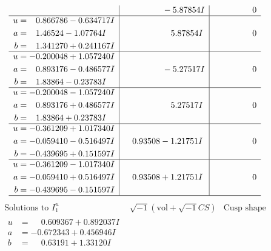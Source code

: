 \documentclass[1p]{elsarticle_modified}
\theoremstyle{definition}
\newcommand{\I}{\sqrt{-1}}
\begin{document}
$$\begin{array}{c|c|c}
 & \phantom{-0.000000 } -5.87854 I & \phantom{-0.000000 } 0 \\ \hline\begin{aligned}
u &= \phantom{-}0.866786 - 0.634717 I \\
a &= \phantom{-}1.46524 - 1.07764 I \\
b &= \phantom{-}1.341270 + 0.241167 I\end{aligned}
 & \phantom{-0.000000 -}5.87854 I & \phantom{-0.000000 } 0 \\ \hline\begin{aligned}
u &= -0.200048 + 1.057240 I \\
a &= \phantom{-}0.893176 - 0.486577 I \\
b &= \phantom{-}1.83864 - 0.23783 I\end{aligned}
 & \phantom{-0.000000 } -5.27517 I & \phantom{-0.000000 } 0 \\ \hline\begin{aligned}
u &= -0.200048 - 1.057240 I \\
a &= \phantom{-}0.893176 + 0.486577 I \\
b &= \phantom{-}1.83864 + 0.23783 I\end{aligned}
 & \phantom{-0.000000 -}5.27517 I & \phantom{-0.000000 } 0 \\ \hline\begin{aligned}
u &= -0.361209 + 1.017340 I \\
a &= -0.059410 - 0.516497 I \\
b &= -0.439695 + 0.151597 I\end{aligned}
 & \phantom{-}0.93508 - 1.21751 I & \phantom{-0.000000 } 0 \\ \hline\begin{aligned}
u &= -0.361209 - 1.017340 I \\
a &= -0.059410 + 0.516497 I \\
b &= -0.439695 - 0.151597 I\end{aligned}
 & \phantom{-}0.93508 + 1.21751 I & \phantom{-0.000000 } 0\\
 \hline 
 \end{array}$$\newpage$$\begin{array}{c|c|c}  
\text{Solutions to }I^u_{1}& \I (\text{vol} + \sqrt{-1}CS) & \text{Cusp shape}\\
 \hline 
\begin{aligned}
u &= \phantom{-}0.609367 + 0.892037 I \\
a &= -0.672343 + 0.456946 I \\
b &= \phantom{-}0.63191 + 1.33120 I\end{aligned}

\end{array}$$
\end{document}
